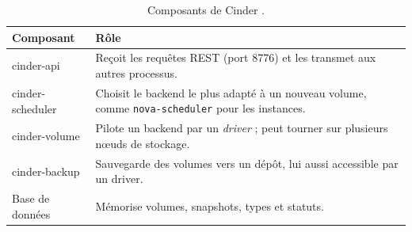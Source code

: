 \begin{table}[!ht]
\centering
\renewcommand{\arraystretch}{1.3}
\begin{tabular}{@{}>{\raggedright\arraybackslash\ttfamily}p{3.4cm}>{\raggedright\arraybackslash}p{12.1cm}@{}}
\toprule
\textrm{\textbf{Composant}} & \textbf{Rôle} \\
\midrule
cinder-api & Reçoit les requêtes REST (port 8776) et les transmet aux autres processus. \\
cinder-scheduler & Choisit le backend le plus adapté à un nouveau volume, comme \texttt{nova-scheduler} pour les instances. \\
cinder-volume & Pilote un backend par un \emph{driver} ; peut tourner sur plusieurs nœuds de stockage. \\
cinder-backup & Sauvegarde des volumes vers un dépôt, lui aussi accessible par un driver. \\
Base de données & Mémorise volumes, snapshots, types et statuts. \\
\bottomrule
\end{tabular}
\caption{Composants de Cinder \parencite{cinder-components}.}
\label{tab:ci-composants}
\end{table}

